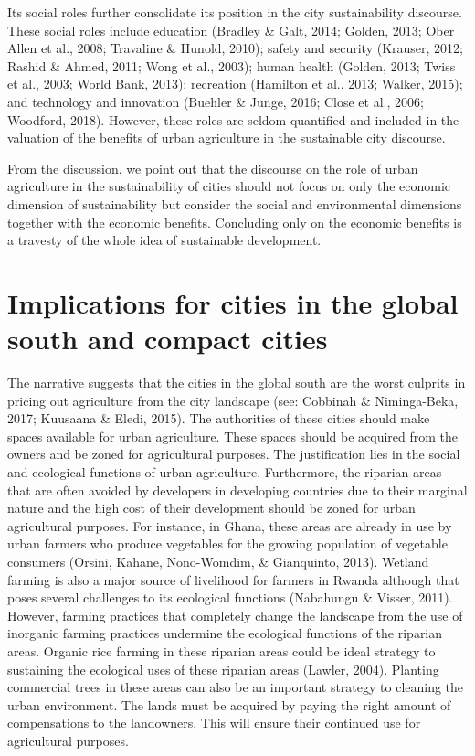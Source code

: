 Its social roles further consolidate its position in the city sustainability discourse. These social roles include education (Bradley \& Galt, 2014; Golden, 2013; Ober Allen et al., 2008; Travaline \& Hunold, 2010); safety and security \cite{Hoornweg2012} (Krauser, 2012; Rashid \& Ahmed, 2011; Wong et al., 2003); human health \cite{Opitz2016} (Golden, 2013; Twiss et al., 2003; World Bank, 2013); recreation (Hamilton et al., 2013; Walker, 2015); and technology and innovation (Buehler \& Junge, 2016; Close et al., 2006; Woodford, 2018). However, these roles are seldom quantified and included in the valuation of the benefits of urban agriculture in the sustainable city discourse.

From the discussion, we point out that the discourse on the role of urban agriculture in the sustainability of cities should not focus on only the economic dimension of sustainability but consider the social and environmental dimensions together with the economic benefits. Concluding only on the economic benefits is a travesty of the whole idea of sustainable development.

\section{Implications for cities in the global south and compact cities}

The narrative suggests that the cities in the global south are the worst culprits in pricing out agriculture from the city landscape (see: Cobbinah \& Niminga-Beka, 2017; Kuusaana \& Eledi, 2015). The authorities of these cities should make spaces available for urban agriculture. These spaces should be acquired from the owners and be zoned for agricultural purposes. The justification lies in the social and ecological functions of urban agriculture. Furthermore, the riparian areas that are often avoided by developers in developing countries due to their marginal nature and the high cost of their development should be zoned for urban agricultural purposes. For instance, in Ghana, these areas are already in use by urban farmers who produce vegetables for the growing population of vegetable consumers \cite{Amponsah2015, Amponsah2016} (Orsini, Kahane, Nono-Womdim, \& Gianquinto, 2013). Wetland farming is also a major source of livelihood for farmers in Rwanda although that poses several challenges to its ecological functions (Nabahungu \& Visser, 2011). However, farming practices that completely change the landscape from the use of inorganic farming practices undermine the ecological functions of the riparian areas. Organic rice farming in these riparian areas could be ideal strategy to sustaining the ecological uses of these riparian areas (Lawler, 2004). Planting commercial trees in these areas can also be an important strategy to cleaning the urban environment. The lands must be acquired by paying the right amount of compensations to the landowners. This will ensure their continued use for agricultural purposes.

